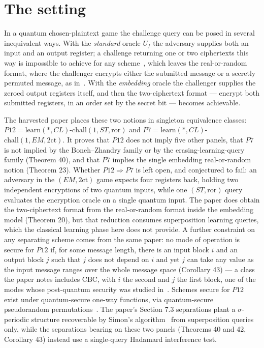 \documentclass{aicr-conjecture}
\newcommand{\ror}{\mathrm{ror}}
\newcommand{\twoct}{2\mathrm{ct}}
\newcommand{\learn}{\mathrm{learn}}
\newcommand{\chall}{\mathrm{chall}}
\begin{document}
\section{The setting}\label{sec:setting}

In a quantum chosen-plaintext game the challenge query can be posed in
several inequivalent ways. With the \emph{standard} oracle $U_f$ the
adversary supplies both an input and an output register; a challenge
returning one or two ciphertexts this way is impossible to achieve for
any scheme~\cite{BZ13b}, which leaves the real-or-random format, where
the challenger encrypts either the submitted message or a secretly
permuted message, as in~\cite{MS16}. With the \emph{embedding} oracle
the challenger supplies the zeroed output registers itself, and then the
two-ciphertext format --- encrypt both submitted registers, in an order
set by the secret bit --- becomes achievable.

The harvested paper places these two notions in singleton equivalence
classes: $P12=\learn(*,CL)$-$\chall(1,ST,\ror)$ and
$P7=\learn(*,CL)$-$\chall(1,EM,\twoct)$. It proves that $P12$ does not
imply five other panels, that $P7$ is not implied by the Boneh--Zhandry
family or by the erasing-learning-query family (Theorem 40), and that
$P7$ implies the single embedding real-or-random notion (Theorem 23).
Whether $P12\Rightarrow P7$ is left open, and conjectured to fail: an
adversary in the $(EM,\twoct)$ game expects four registers back, holding
two independent encryptions of two quantum inputs, while one $(ST,\ror)$
query evaluates the encryption oracle on a single quantum input. The
paper does obtain the two-ciphertext format from the real-or-random
format inside the embedding model (Theorem 20), but that reduction
consumes superposition learning queries, which the classical learning
phase here does not provide. A further constraint on any separating
scheme comes from the same paper: no mode of operation is secure for
$P12$ if, for some message length, there is an input block $i$ and an
output block $j$ such that $j$ does not depend on $i$ and yet $j$ can
take any value as the input message ranges over the whole message space
(Corollary 43) --- a class the paper notes includes CBC, with $i$ the
second and $j$ the first block, one of the modes whose post-quantum
security was studied in~\cite{ATTU16}. Schemes secure for $P12$ exist
under quantum-secure one-way functions, via quantum-secure pseudorandom
permutations~\cite{Zha16}. The paper's Section 7.3 separations plant a
$\sigma$-periodic structure recoverable by Simon's
algorithm~\cite{Sim97} from superposition queries only, while the
separations bearing on these two panels (Theorems 40 and 42,
Corollary 43) instead use a single-query Hadamard interference test.
\end{document}
